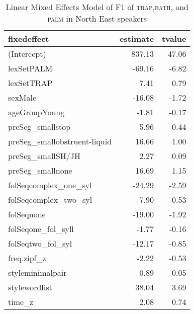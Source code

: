 \begin{table}[ht]
\centering
\begin{tabular}{lrr}
  \hline
fixedeffect & estimate & tvalue \\ 
  \hline
(Intercept) & 837.13 & 47.06 \\ 
  lexSetPALM & -69.16 & -6.82 \\ 
  lexSetTRAP & 7.41 & 0.79 \\ 
  sexMale & -16.08 & -1.72 \\ 
  ageGroupYoung & -1.81 & -0.17 \\ 
  preSeg\_smallstop & 5.96 & 0.44 \\ 
  preSeg\_smallobstruent-liquid & 16.66 & 1.00 \\ 
  preSeg\_smallSH/JH & 2.27 & 0.09 \\ 
  preSeg\_smallnone & 16.69 & 1.15 \\ 
  folSeqcomplex\_one\_syl & -24.29 & -2.59 \\ 
  folSeqcomplex\_two\_syl & -7.90 & -0.53 \\ 
  folSeqnone & -19.00 & -1.92 \\ 
  folSeqone\_fol\_syll & -1.77 & -0.16 \\ 
  folSeqtwo\_fol\_syl & -12.17 & -0.85 \\ 
  freq.zipf\_z & -2.22 & -0.53 \\ 
  styleminimalpair & 0.89 & 0.05 \\ 
  stylewordlist & 38.04 & 3.69 \\ 
  time\_z & 2.08 & 0.74 \\ 
   \hline
\end{tabular}
\caption{Linear Mixed Effects Model of F1 of \textsc{trap},\textsc{bath}, and \textsc{palm} in North East speakers \label{tbl:TBF1NE}} 
\end{table}
